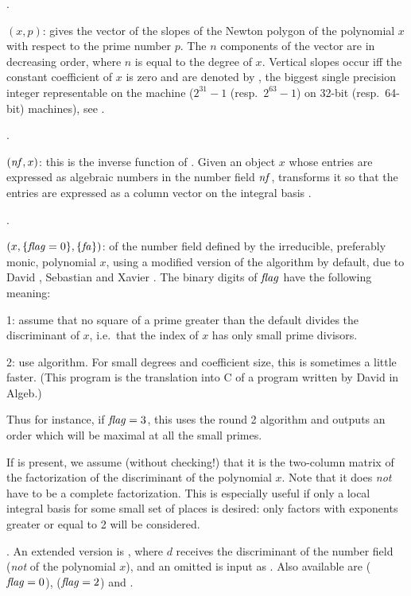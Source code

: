 .

$(x,p)$: gives the vector of the slopes of the Newton
polygon of the polynomial $x$ with respect to the prime number $p$. The $n$
components of the vector are in decreasing order, where $n$ is equal to the
degree of $x$. Vertical slopes occur iff the constant coefficient of $x$ is
zero and are denoted by , the biggest single precision
integer representable on the machine ($2^{31}-1$ (resp.~$2^{63}-1$) on 32-bit
(resp.~64-bit) machines), see .

.

$(\hbox{\it nf\/},x)$: this is the inverse function of
. Given an object $x$ whose entries are expressed as
algebraic numbers in the number field $\hbox{\it nf\/}$, transforms it so that the
entries are expressed as a column vector on the integral basis
.

.

$(x,\{\hbox{\it f\kern0pt lag\/}=0\},\{\hbox{\it fa\/}\})$:  of the number
field defined by the irreducible, preferably monic, polynomial $x$, using a
modified version of the  algorithm by default, due to David
, Sebastian  and Xavier . The binary digits
of $\hbox{\it f\kern0pt lag\/}$ have the following meaning:

1: assume that no square of a prime greater than the default 
divides the discriminant of $x$, i.e.~that the index of $x$ has only small
prime divisors.

2: use  algorithm. For small degrees and coefficient size, this
is sometimes a little faster. (This program is the translation into C of a
program written by David  in Algeb.)

Thus for instance, if $\hbox{\it f\kern0pt lag\/}=3$, this uses the round 2 algorithm and outputs
an order which will be maximal at all the small primes.

If  is present, we assume (without checking!) that it is the two-column
matrix of the factorization of the discriminant of the polynomial $x$. Note
that it does \emph{not} have to be a complete factorization. This is
especially useful if only a local integral basis for some small set of places
is desired: only factors with exponents greater or equal to 2 will be
considered.

. An extended version is
, where $d$ receives the discriminant of the
number field (\emph{not} of the polynomial $x$), and an omitted  is input
as . Also available are  ($\hbox{\it f\kern0pt lag\/}=0$),
 ($\hbox{\it f\kern0pt lag\/}=2$) and .

